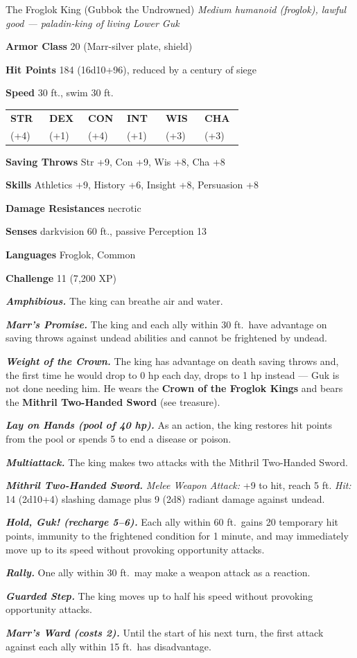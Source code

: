 \documentclass[10pt,twoside]{report}
\makeatletter
\newcommand{\msub}[1]{{\itshape #1}\par}
\newcommand{\mrule}{\par\vspace{2pt}{\color{gukred}\rule{\linewidth}{1.1pt}}\par\vspace{2pt}}
\newcommand{\mthin}{\par\vspace{1pt}{\color{gukred!60}\rule{\linewidth}{0.5pt}}\par\vspace{2pt}}
\newcommand{\mfield}[2]{\noindent\textbf{\color{gukred}#1} #2\par}
\newcommand{\mhead}[1]{\par\smallskip{\sffamily\bfseries\scshape\color{gukred}#1}\par
  \vspace{-3pt}{\color{gukred}\rule{\linewidth}{0.7pt}}\par\vspace{2pt}}
\newcommand{\mtrait}[2]{\noindent\textbf{\itshape #1} #2\par\vspace{2pt}}
\newcommand{\abilities}[6]{\par\smallskip\noindent
  {\setlength{\tabcolsep}{1.5pt}%
  \begin{tabular}{@{}*{6}{p{0.15\linewidth}}@{}}
  \centering\sffamily\bfseries\color{gukred}STR &\centering\sffamily\bfseries\color{gukred}DEX
  &\centering\sffamily\bfseries\color{gukred}CON &\centering\sffamily\bfseries\color{gukred}INT
  &\centering\sffamily\bfseries\color{gukred}WIS &\centering\arraybackslash\sffamily\bfseries\color{gukred}CHA\\
  \centering #1 &\centering #2 &\centering #3 &\centering #4 &\centering #5 &\centering\arraybackslash #6\\
  \end{tabular}}\par\smallskip}
\makeatother
\begin{document}
\begin{statblock}{The Froglok King (Gubbok the Undrowned)}
\msub{Medium humanoid (froglok), lawful good --- \textnormal{paladin-king of living Lower Guk}}
\mrule
\mfield{Armor Class}{20 (Marr-silver plate, shield)}
\mfield{Hit Points}{184 (16d10+96), reduced by a century of siege}
\mfield{Speed}{30 ft., swim 30 ft.}
\abilities{18 (+4)}{12 (+1)}{18 (+4)}{13 (+1)}{16 (+3)}{17 (+3)}
\mthin
\mfield{Saving Throws}{Str +9, Con +9, Wis +8, Cha +8}
\mfield{Skills}{Athletics +9, History +6, Insight +8, Persuasion +8}
\mfield{Damage Resistances}{necrotic}
\mfield{Senses}{darkvision 60 ft., passive Perception 13}
\mfield{Languages}{Froglok, Common}
\mfield{Challenge}{11 (7{,}200 XP)}
\mrule
\mtrait{Amphibious.}{The king can breathe air and water.}
\mtrait{Marr's Promise.}{The king and each ally within 30 ft.\ have advantage on saving throws against undead abilities and cannot be frightened by undead.}
\mtrait{Weight of the Crown.}{The king has advantage on death saving throws and, the first time he would drop to 0 hp each day, drops to 1 hp instead --- Guk is not done needing him. He wears the \textbf{Crown of the Froglok Kings} and bears the \textbf{Mithril Two-Handed Sword} (see treasure).}
\mtrait{Lay on Hands (pool of 40 hp).}{As an action, the king restores hit points from the pool or spends 5 to end a disease or poison.}
\mhead{Actions}
\mtrait{Multiattack.}{The king makes two attacks with the Mithril Two-Handed Sword.}
\mtrait{Mithril Two-Handed Sword.}{\textit{Melee Weapon Attack:} +9 to hit, reach 5 ft. \textit{Hit:} 14 (2d10+4) slashing damage plus 9 (2d8) radiant damage against undead.}
\mtrait{Hold, Guk! (recharge 5--6).}{Each ally within 60 ft.\ gains 20 temporary hit points, immunity to the frightened condition for 1 minute, and may immediately move up to its speed without provoking opportunity attacks.}
\mhead{Legendary Actions (3/round)}
\mtrait{Rally.}{One ally within 30 ft.\ may make a weapon attack as a reaction.}
\mtrait{Guarded Step.}{The king moves up to half his speed without provoking opportunity attacks.}
\mtrait{Marr's Ward (costs 2).}{Until the start of his next turn, the first attack against each ally within 15 ft.\ has disadvantage.}
\end{statblock}
\end{document}
